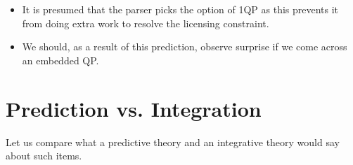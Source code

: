 \documentclass[12pt]{article}
\begin{document}
\noindent{}

\begin{itemize}
    \item It is presumed that the parser picks the option of 1QP as this prevents it from doing extra work to resolve
    the licensing constraint.
    \item We should, as a result of this prediction, observe surprise if we come across an embedded QP.
\end{itemize}

\section{Prediction vs. Integration}
Let us compare what a predictive theory and an integrative theory would say about such items.
\end{document}
